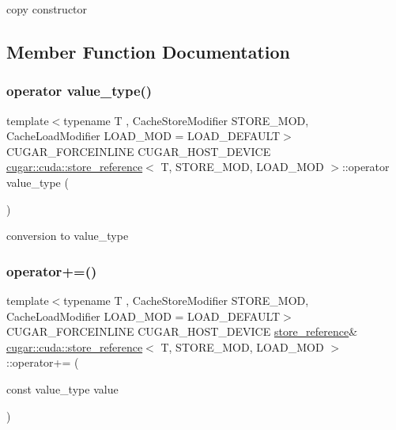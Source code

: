 copy constructor 

\subsection{Member Function Documentation}
\mbox{\label{structcugar_1_1cuda_1_1store__reference_a7cd742e206cf9bbe7f4052e93d6ca45d}} 
\subsubsection{\texorpdfstring{operator value\+\_\+type()}{operator value\_type()}}
{\footnotesize\ttfamily template$<$typename T , Cache\+Store\+Modifier S\+T\+O\+R\+E\+\_\+\+M\+OD, Cache\+Load\+Modifier L\+O\+A\+D\+\_\+\+M\+OD = L\+O\+A\+D\+\_\+\+D\+E\+F\+A\+U\+LT$>$ \\
C\+U\+G\+A\+R\+\_\+\+F\+O\+R\+C\+E\+I\+N\+L\+I\+NE C\+U\+G\+A\+R\+\_\+\+H\+O\+S\+T\+\_\+\+D\+E\+V\+I\+CE \hyperlink{structcugar_1_1cuda_1_1store__reference}{cugar\+::cuda\+::store\+\_\+reference}$<$ T, S\+T\+O\+R\+E\+\_\+\+M\+OD, L\+O\+A\+D\+\_\+\+M\+OD $>$\+::operator value\+\_\+type (\begin{DoxyParamCaption}{ }\end{DoxyParamCaption})\hspace{0.3cm}{\ttfamily [inline]}}

conversion to value\+\_\+type \mbox{\label{structcugar_1_1cuda_1_1store__reference_aee235f22969fe1e5ac1cefb19395b086}} 
\subsubsection{\texorpdfstring{operator+=()}{operator+=()}}
{\footnotesize\ttfamily template$<$typename T , Cache\+Store\+Modifier S\+T\+O\+R\+E\+\_\+\+M\+OD, Cache\+Load\+Modifier L\+O\+A\+D\+\_\+\+M\+OD = L\+O\+A\+D\+\_\+\+D\+E\+F\+A\+U\+LT$>$ \\
C\+U\+G\+A\+R\+\_\+\+F\+O\+R\+C\+E\+I\+N\+L\+I\+NE C\+U\+G\+A\+R\+\_\+\+H\+O\+S\+T\+\_\+\+D\+E\+V\+I\+CE \hyperlink{structcugar_1_1cuda_1_1store__reference}{store\+\_\+reference}\& \hyperlink{structcugar_1_1cuda_1_1store__reference}{cugar\+::cuda\+::store\+\_\+reference}$<$ T, S\+T\+O\+R\+E\+\_\+\+M\+OD, L\+O\+A\+D\+\_\+\+M\+OD $>$\+::operator+= (\begin{DoxyParamCaption}\item[{const value\+\_\+type}]{value }\end{DoxyParamCaption})\hspace{0.3cm}{\ttfamily [inline]}}

